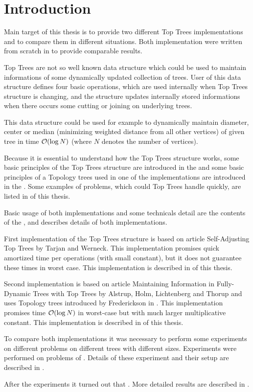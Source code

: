 \chapter*{Introduction}

Main target of this thesis is to provide two different {\I Top Trees}
implementations and to compare them in different situations. Both implementation
were written from scratch in \Cpp{} to provide comparable results.

{\I Top Trees} are not so well known data structure which could be used to
maintain informations of some dynamically updated collection of trees. User of
this data structure defines four basic operations, which are used internally
when Top Trees structure is changing, and the structure updates internally
stored informations when there occurs some cutting or joining on underlying
trees.

This data structure could be used for example to dynamically maintain diameter,
center or median (minimizing weighted distance from all other vertices) of given
tree in time ${\cal O}(\log N)$ (where $N$ denotes the number of vertices).

Because it is essential to understand how the Top Trees structure works, some
basic principles of the Top Trees structure are introduced in the 
and some basic principles of a Topology trees used in one of the implementations
are introduced in the . Some examples of problems, which could Top
Trees handle quickly, are listed in  of this thesis.

Basic usage of both implementations and some technicals detail are the contents
of the ,  and
 describes details of both implementations.

First implementation of the Top Trees structure is based on article {\I
Self-Adjusting Top Trees} \cite{SelfAdjustingTT} by Tarjan and Werneck. This
implementation promises quick amortized time per operations (with small
constant), but it does not guarantee these times in worst case. This
implementation is described in  of this thesis.

Second implementation is based on article {\I Maintaining Information in Fully-
Dynamic Trees with Top Trees} \cite{TopTrees} by Alstrup, Holm, Lichtenberg and
Thorup and uses Topology trees introduced by Frederickson in
\cite{DSforDynamicallyMaintainingRootedTrees}. This implementation promises time
${\cal O}(\log N)$ in worst-case but with much larger multiplicative constant. This
implementation is described in  of this thesis.

To compare both implementations it was necessary to perform some experiments on
different problems on different trees with different sizes. Experiments were
performed on problems of . Details of these experiment
and their setup are described in .

After the experiments it turned out that
.
More detailed results are described in .

